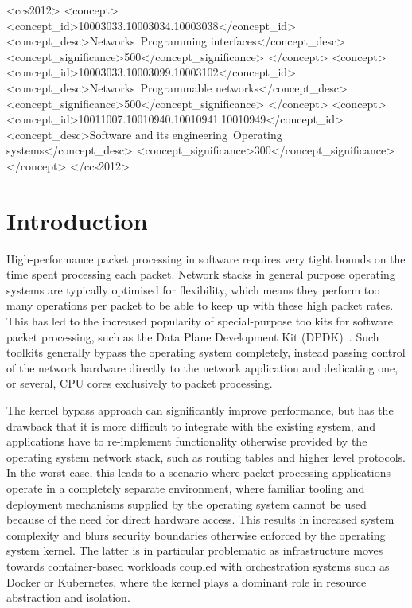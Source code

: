 \documentclass[sigconf]{acmart}
\begin{document}
 \begin{CCSXML}
<ccs2012>
<concept>
<concept_id>10003033.10003034.10003038</concept_id>
<concept_desc>Networks~Programming interfaces</concept_desc>
<concept_significance>500</concept_significance>
</concept>
<concept>
<concept_id>10003033.10003099.10003102</concept_id>
<concept_desc>Networks~Programmable networks</concept_desc>
<concept_significance>500</concept_significance>
</concept>
<concept>
<concept_id>10011007.10010940.10010941.10010949</concept_id>
<concept_desc>Software and its engineering~Operating systems</concept_desc>
<concept_significance>300</concept_significance>
</concept>
</ccs2012>
\end{CCSXML}


\maketitle

\section{Introduction}%
\label{sec:introduction}
High-performance packet processing in software requires very tight bounds on the
time spent processing each packet. Network stacks in general purpose operating
systems are typically optimised for flexibility, which means they perform too
many operations per packet to be able to keep up with these high packet rates.
This has led to the increased popularity of special-purpose toolkits for
software packet processing, such as the Data Plane Development Kit
(DPDK)~\cite{dpdk}. Such toolkits generally bypass the operating system
completely, instead passing control of the network hardware directly to the
network application and dedicating one, or several, CPU cores exclusively to
packet processing.

The kernel bypass approach can significantly improve performance, but has the
drawback that it is more difficult to integrate with the existing system, and
applications have to re-implement functionality otherwise provided by the
operating system network stack, such as routing tables and higher level
protocols. In the worst case, this leads to a scenario where packet processing
applications operate in a completely separate environment, where familiar
tooling and deployment mechanisms supplied by the operating system cannot be
used because of the need for direct hardware access. This results in increased
system complexity and blurs security boundaries otherwise enforced by the
operating system kernel. The latter is in particular problematic as
infrastructure moves towards container-based workloads coupled with
orchestration systems such as Docker or Kubernetes, where the kernel plays a
dominant role in resource abstraction and isolation.
\end{document}
